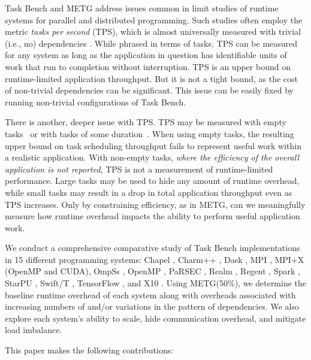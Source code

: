 Task Bench and METG address issues common in limit studies of runtime
systems for parallel and distributed programming. Such studies often
employ the metric \emph{tasks per second} (TPS), which is almost
universally measured with trivial (i.e., no) dependencies \cite{LegionTracing18, Canary16, Armstrong14}. While
phrased in terms of tasks, TPS can be measured for any system as long
as the application in question has identifiable units of work that run
to completion without interruption. TPS is an upper bound on
runtime-limited application throughput. But it is not a tight bound, as the
cost of non-trivial dependencies can be significant. This issue can be easily fixed by running non-trivial
configurations of Task Bench.

There is another, deeper issue with TPS. TPS may be measured with
empty tasks~\cite{LegionTracing18} or with tasks of some
duration~\cite{Canary16, Armstrong14}. When using empty tasks, the
resulting upper bound on task scheduling throughput fails to represent
useful work within a realistic application. With non-empty tasks,
\emph{where the efficiency of the overall application is not
 reported}, TPS is not a measurement of runtime-limited
performance. Large tasks may be used to hide any amount of runtime
overhead, while small tasks may result in a drop in total
application throughput even as TPS increases. Only by constraining
efficiency, as in METG, can we meaningfully measure how runtime
overhead impacts the ability to perform useful application work.

We conduct a comprehensive comparative study of Task Bench
implementations in 15 different programming systems:
Chapel \cite{Chapel15}, Charm++ \cite{Charmpp93}, Dask \cite{Dask15}, MPI \cite{MPI}, MPI+X (OpenMP and CUDA),
OmpSs \cite{OmpSs11}, OpenMP \cite{OpenMPSpec40},
PaRSEC \cite{PARSEC13}, Realm \cite{Realm14}, Regent \cite{Regent15},
Spark \cite{Spark10}, StarPU \cite{StarPU11},
Swift/T \cite{Wozniak13}, TensorFlow \cite{TensorFlow15}, and
X10 \cite{X1005}. Using METG(50\%), we determine the baseline
runtime overhead of each system along with overheads associated with
increasing numbers of and/or variations in the pattern of dependencies. We
also explore each system's ability to scale, hide communication
overhead, and mitigate load imbalance.

This paper makes the following contributions:


